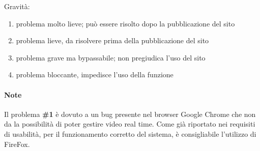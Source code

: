 Gravità:
	\begin{enumerate}
		\item problema molto lieve; può essere risolto dopo la pubblicazione 
		del sito
		\item problema lieve, da risolvere prima della pubblicazione del sito
		\item problema grave ma bypassabile; non pregiudica l'uso del sito
		\item problema bloccante, impedisce l'uso della funzione
	\end{enumerate}

\paragraph{Note} Il problema \textbf{\#1} è dovuto a un bug presente nel 
browser 
Google Chrome che non da la possibilità di poter gestire video real time. Come 
già riportato nei requisiti di usabilità, per il funzionamento corretto del 
sistema, è consigliabile l'utilizzo di FireFox.